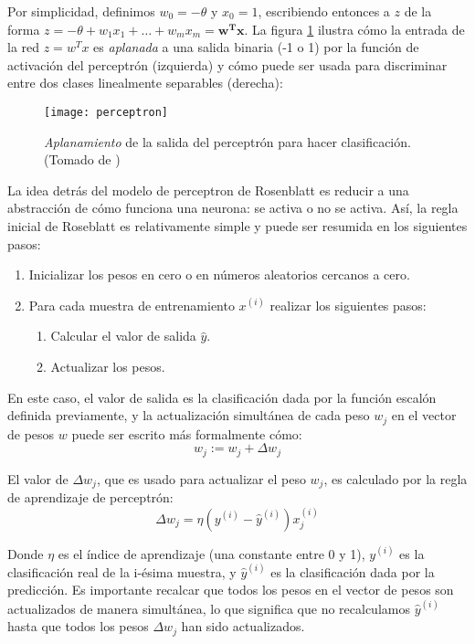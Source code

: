 Por simplicidad, definimos $w_0=-\theta$ y $x_0=1$, escribiendo
entonces a $z$ de la forma $z=-\theta + w_1x_1 + \dots + w_mx_m =
\mathbf{w^Tx}$.  La figura \ref{fig:binary} ilustra cómo la entrada de
la red $z=w^Tx$ es \textit{aplanada} a una salida binaria (-1 o 1) por
la función de activación del perceptrón (izquierda) y cómo puede ser
usada para discriminar entre dos clases linealmente separables
(derecha):
\begin{figure}[H]
  \texttt{[image: perceptron]} \centering
  \caption{\textit{Aplanamiento} de la salida del perceptrón para
    hacer clasificación.  (Tomado de \cite{python})}
  \label{fig:binary}
\end{figure}

La idea detrás del modelo de perceptron de Rosenblatt es reducir a una
abstracción de cómo funciona una neurona: se activa o no se
activa. Así, la regla inicial de Roseblatt es relativamente simple y
puede ser resumida en los siguientes pasos:
\begin{enumerate}
  \item Inicializar los pesos en cero o en números aleatorios cercanos
    a cero.
  \item Para cada muestra de entrenamiento $x^{(i)}$ realizar los
    siguientes pasos:
  \begin{enumerate}
    \item Calcular el valor de salida $\hat y$.
    \item Actualizar los pesos.
  \end{enumerate}
\end{enumerate}


En este caso, el valor de salida es la clasificación dada por la
función escalón definida previamente, y la actualización simultánea de
cada peso $w_j$ en el vector de pesos $w$ puede ser escrito más
formalmente cómo:
\begin{equation}
  w_j := w_j + \Delta w_j
\end{equation}

El valor de $\Delta w_j$, que es usado para actualizar el peso $w_j$,
es calculado por la regla de aprendizaje de perceptrón:
\begin{equation}
  \Delta w_j = \eta (y^{(i)} - \hat y^{(i)})x^{(i)}_j
\end{equation}

Donde $\eta$ es el índice de aprendizaje (una constante entre 0 y 1),
$y^{(i)}$ es la clasificación real de la i-ésima muestra, y $\hat
y^{(i)}$ es la clasificación dada por la predicción. Es importante
recalcar que todos los pesos en el vector de pesos son actualizados de
manera simultánea, lo que significa que no recalculamos $\hat y^{(i)}$
hasta que todos los pesos $\Delta w_j$ han sido actualizados.

